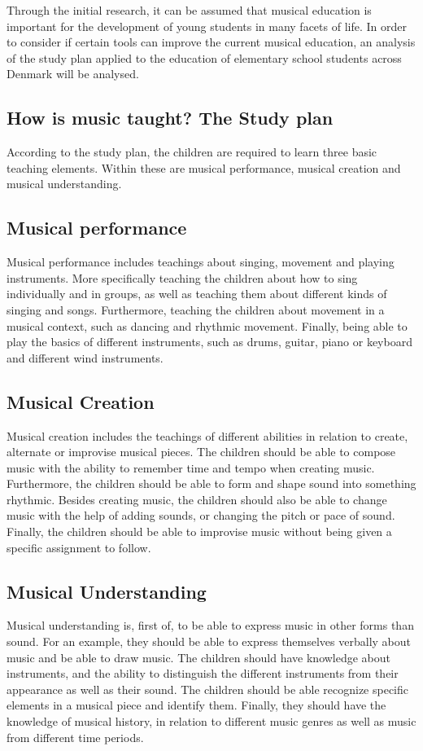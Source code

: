 	Through the initial research, it can be assumed that musical education is important for the development of young students in many facets of life. In order to consider if certain tools can improve the current musical education, an analysis of the study plan applied to the education of elementary school students across Denmark will be analysed.
	
	\subsection{How is music taught? The Study plan}
	
	According to the study plan, the children are required to learn three basic teaching elements. Within these are musical performance, musical creation and musical understanding.
	
	\subsection*{Musical performance}
	Musical performance includes teachings about singing, movement and playing instruments. More specifically teaching the children about how to sing individually and in groups, as well as teaching them about different kinds of singing and songs. Furthermore, teaching the children about movement in a musical context, such as dancing and rhythmic movement. Finally, being able to play the basics of different instruments, such as drums, guitar, piano or keyboard and different wind instruments.
	
	\subsection*{Musical Creation}
	Musical creation includes the teachings of different abilities in relation to create, alternate or improvise musical pieces. The children should be able to compose music with the ability to remember time and tempo when creating music. Furthermore, the children should be able to form and shape sound into something rhythmic. Besides creating music, the children should also be able to change music with the help of adding sounds, or changing the pitch or pace of sound. Finally, the children should be able to improvise music without being given a specific assignment to follow.
	
	\subsection*{Musical Understanding}
	Musical understanding is, first of, to be able to express music in other forms than sound. For an example, they should be able to express themselves verbally about music and be able to draw music. The children should have knowledge about instruments, and the ability to distinguish the different instruments from their appearance as well as their sound. The children should be able recognize specific elements in a musical piece and identify them. Finally, they should have the knowledge of musical history, in relation to different music genres as well as music from different time periods.
	\\
	
